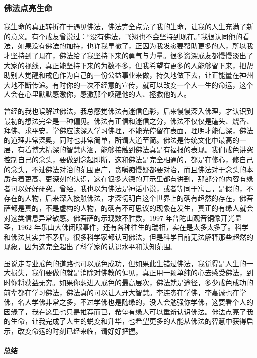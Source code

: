 \subsubsection{佛法点亮生命}

我生命的真正转折在于遇见佛法，佛法完全点亮了我的生命，让我的人生充满了新的意义。有个戒友曾说过：“没有佛法，飞翔也不会坚持到现在。”我很认同他的看法，如果没有佛法的加持，也许我早撤了，正因为我发愿要帮助更多的人，所以我才坚持到了现在，佛法给了我坚持下来的勇气与力量。很多资深戒友都慢慢淡出了大家的视线，真正能坚持下来的为数不多，但我希望有更多的人能够留下来，把帮助别人觉醒和戒色作为自己的一份公益事业来做，持久地做下去，让正能量在神州大地不断传递。有时你的一次不经意的宣传，就可以改变一个人一生的命运，这个人会在心里默默感激你，感激那个唤醒他的人、拯救他的人。

曾经的我也误解过佛法，我总感觉佛法有迷信色彩，后来慢慢深入佛理，才认识到最初的想法完全是一种偏见。佛法有正信和迷信之分，佛法不仅仅是磕头、烧香、拜佛、求平安，学佛应该深入学习佛理，不能光停留在表面，理明才能信深，佛法的道理非常深奥，同时也非常简单，所谓大道至简。佛法是传统文化中最高的一层，有着博大精深的智慧内涵，能够接触到佛法真是有福报的表现。我们戒色讲究控制自己的念头，要做到念起即断，这和佛法是完全相通的，都是在修心，修自己的念头，不过佛法对治的范围更广，贪嗔痴慢疑都要对治，而且佛法对于念头的本质有着更高、更深刻的认识，这在很多大德的开示里都有讲到，那部分的内容有缘者可以好好研究。曾经，我也以为佛法是神话小说，或者等同于寓言，是假的，不存在的人物，后来深入接触佛法，才深切明白这个世界上的确有超然的存在，佛菩萨都是真的，不是虚构的人物，的确有不可思议的现象在发生，真正的有缘人就会对这类信息异常敏感。佛菩萨的示现数不胜数，1997 年普陀山观音铜像开光显圣，1962 年乐山大佛闭眼事件，还有各种往生的瑞相，实在是太多太多了。科学和佛法其实并不矛盾，很多科学家都认可佛法，但是科学目前无法解释那些超然的现象，因为这完全超出了科学家的认识水平和认知范围。

虽说走专业戒色的道路也可以戒色成功，但如果此生错过佛法，我觉得是人生的一大损失，我们要做的就是消除对佛教的偏见，真正用一颗单纯的心去感受佛法，到时你将获益无穷。如果你想进入戒色的最高层次，佛法就是途径，多少戒色成功的前辈都在学习佛法，佛法真的可以让人开大智慧。李连杰在学佛，李嘉诚也在学佛，名人学佛非常之多，不过学佛也是随缘的，没人会勉强你学佛，这要看个人的因缘了，我在这里也只是推荐而已，希望有缘人可以重新认识佛法。佛法点亮了我的生命，让我完成了人生的蜕变和升华，也希望更多的人能从佛法的智慧中获得启示，改变命运的时刻已经来临，请好好把握。

\paragraph*{总结}

